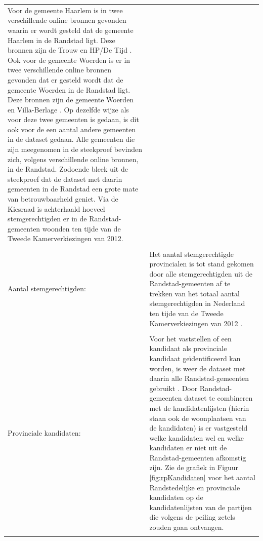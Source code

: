 \begin{tabularx}{\textwidth}{LI}
\hspace*{1em} Voor de gemeente Haarlem is in twee verschillende online bronnen gevonden waarin er wordt gesteld dat de gemeente Haarlem in de Randstad ligt. Deze bronnen zijn de Trouw \citeyear{trouwhaarlem} en HP/De Tijd \citeyear{HPhaarlem}. Ook voor de gemeente Woerden is er in twee verschillende online bronnen gevonden dat er gesteld wordt dat de gemeente Woerden in de Randstad ligt. Deze bronnen zijn de gemeente Woerden \citeyear{gemeentewoerden} en Villa-Berlage \citeyear{villaberlage}. Op dezelfde wijze als voor deze twee gemeenten is gedaan, is dit ook voor de een aantal andere gemeenten in de dataset gedaan. Alle gemeenten die zijn meegenomen in de steekproef bevinden zich, volgens verschillende online bronnen, in de Randstad. Zodoende bleek uit de steekproef dat de dataset met daarin gemeenten in de Randstad een grote mate van betrouwbaarheid geniet. Via de Kiesraad \citeyearpar{Kiesraad_databank} is achterhaald hoeveel stemgerechtigden er in de Randstad-gemeenten woonden ten tijde van de Tweede Kamerverkiezingen van 2012.  \\
\\  
Aantal stemgerechtigden:  & Het aantal stemgerechtigde provincialen is tot stand gekomen door alle stemgerechtigden uit de Randstad-gemeenten \citep{randstad} af te trekken van het totaal aantal stemgerechtigden in Nederland ten tijde van de Tweede Kamerverkiezingen van 2012 \citep{Kiesraad_uitslag}.   \\
\\
Provinciale kandidaten: &  Voor het vaststellen of een kandidaat als provinciale kandidaat geïdentificeerd kan worden, is weer de dataset met daarin alle Randstad-gemeenten gebruikt \citep{randstad}. Door Randstad-gemeenten dataset te combineren met de kandidatenlijsten (hierin staan ook de woonplaatsen van de kandidaten) is er vastgesteld welke kandidaten wel en welke kandidaten er niet uit de Randstad-gemeenten afkomstig zijn.  Zie de grafiek in Figuur \ref{fig:rpKandidaten} voor het aantal Randstedelijke en provinciale kandidaten op de kandidatenlijsten van de partijen die volgens de peiling zetels zouden gaan ontvangen.\\
\\
 \end{tabularx}


